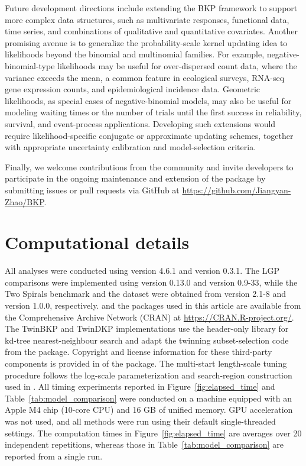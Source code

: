 \documentclass[article, shortnames]{jss}
\begin{document}
Future development directions include extending the BKP framework to support more complex data structures, such as multivariate responses, functional data, time series, and combinations of qualitative and quantitative covariates.
Another promising avenue is to generalize the probability-scale kernel updating idea to likelihoods beyond the binomial and multinomial families.
For example, negative-binomial-type likelihoods may be useful for over-dispersed count data, where the variance exceeds the mean, a common feature in ecological surveys, RNA-seq gene expression counts, and epidemiological incidence data.
Geometric likelihoods, as special cases of negative-binomial models, may also be useful for modeling waiting times or the number of trials until the first success in reliability, survival, and event-process applications.
Developing such extensions would require likelihood-specific conjugate or approximate updating schemes, together with appropriate uncertainty calibration and model-selection criteria.

Finally, we welcome contributions from the community and invite developers to participate in the ongoing maintenance and extension of the package by submitting issues or pull requests via GitHub at \url{https://github.com/Jiangyan-Zhao/BKP}.



\section*{Computational details}
All analyses were conducted using  version 4.6.1 and  version 0.3.1. The LGP comparisons were implemented using  version 0.13.0 and  version 0.9-33, while the Two Spirals benchmark and the  dataset were obtained from  version 2.1-8 and  version 1.0.0, respectively.  and the  packages used in this article are available from the Comprehensive  Archive Network (CRAN) at \url{https://CRAN.R-project.org/}. The TwinBKP and TwinDKP implementations use the header-only  library for kd-tree nearest-neighbour search and adapt the twinning subset-selection code from the  package. Copyright and license information for these third-party components is provided in  of the  package. The multi-start length-scale tuning procedure follows the log-scale parameterization and search-region construction used in . 
All timing experiments reported in Figure~\ref{fig:elapsed_time} and Table~\ref{tab:model_comparison} were conducted on a machine equipped
with an Apple M4 chip (10-core CPU) and 16 GB of unified memory.
GPU acceleration was not used, and all methods were run using their default single-threaded settings. 
The computation times in Figure~\ref{fig:elapsed_time} are averages over 20 independent repetitions, whereas those in Table~\ref{tab:model_comparison} are reported from a single run.
\end{document}
